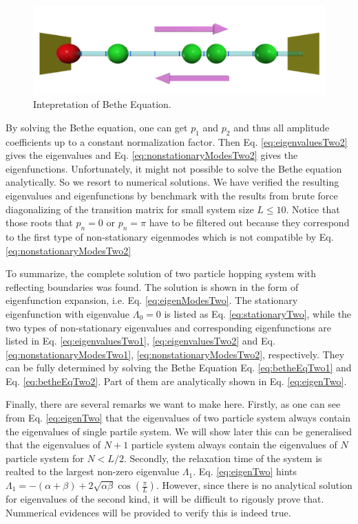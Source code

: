\documentclass[12pt,a4paper]{article}
\begin{document}
\begin{figure}[htpb]
    \centering
    \includegraphics[width=0.8\linewidth]{betheEq}
    \caption{Intepretation of Bethe Equation.}
    \label{fig:betheEq}
\end{figure}
By solving the Bethe equation, one can get $p_1$ and $p_2$ and thus all
amplitude coefficients up to a constant normalization factor. Then Eq.
\eqref{eq:eigenvaluesTwo2} gives the eigenvalues and Eq.
\eqref{eq:nonstationaryModesTwo2} gives the eigenfunctions.
Unfortunately, it might not possible to solve the Bethe equation analytically.
So we resort to numerical solutions. We have verified the resulting eigenvalues
and eigenfunctions by benchmark with the results from brute force diagonalizing
of the transition matrix for small system size $L\le10$. Notice that those roots
that $p_n=0$ or $p_n=\pi$ have to be filtered out because they correspond to the
first type of non-stationary eigenmodes which is not compatible by Eq.
\eqref{eq:nonstationaryModesTwo2}


To summarize, the complete solution of two particle hopping system with
reflecting boundaries was found. The solution is shown in the form of
eigenfunction expansion, i.e. Eq. \eqref{eq:eigenModesTwo}. The stationary
eigenfunction with eigenvalue $\Lambda_0=0$ is listed as Eq.
\eqref{eq:stationaryTwo}, while the two types of non-stationary eigenvalues and
corresponding eigenfunctions are listed in Eq. \eqref{eq:eigenvaluesTwo1},
\eqref{eq:eigenvaluesTwo2} and Eq.
\eqref{eq:nonstationaryModesTwo1}, \eqref{eq:nonstationaryModesTwo2},
respectively. They can be fully determined by  solving the Bethe Equation Eq.
\eqref{eq:betheEqTwo1} and Eq. \eqref{eq:betheEqTwo2}. Part of them are
analytically shown in Eq. \eqref{eq:eigenTwo}.

Finally, there are several remarks we want to make here.
Firstly, as one can see from Eq.  \eqref{eq:eigenTwo} that the eigenvalues of two
particle system always contain the eigenvalues of single partile system. We will
show later this can be generalised that the eigenvalues of $N+1$ particle system
always contain the eigenvalues of $N$ particle system for $N<L/2$. Secondly, the
relaxation time of the system is realted to the largest non-zero eigenvalue
$\Lambda_1$. Eq.  \eqref{eq:eigenTwo} hints
$\Lambda_1=-(\alpha+\beta)+2\sqrt{\alpha\beta} \cos\left(\frac{\pi}{L}\right)$.
However, since there is no analytical solution for eigenvalues of the second
kind, it will be difficult to rigously prove that. Nummerical evidences will be
provided to verify this is indeed true.
\end{document}

